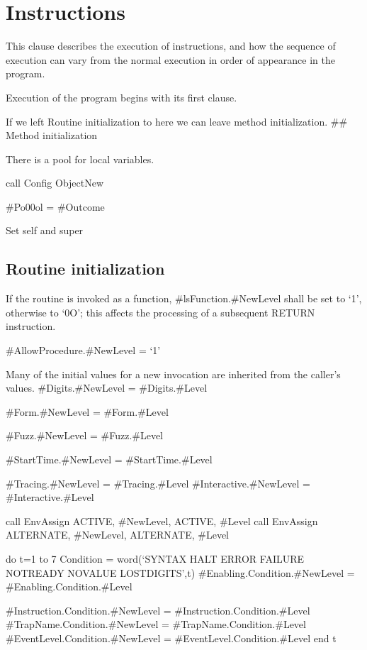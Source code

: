 \hypertarget{instructions}{%
\chapter{Instructions}\label{instructions}}

This clause describes the execution of instructions, and how the
sequence of execution can vary from the normal execution in order of
appearance in the program.

Execution of the program begins with its first clause.

If we left Routine initialization to here we can leave method
initialization. \#\# Method initialization

There is a pool for local variables.

call Config ObjectNew

\#Po00ol = \#Outcome

Set self and super

\hypertarget{routine-initialization}{%
\section{Routine initialization}\label{routine-initialization}}

If the routine is invoked as a function, \#lsFunction.\#NewLevel shall
be set to `1', otherwise to `0O'; this affects the processing of a
subsequent RETURN instruction.

\#AllowProcedure.\#NewLevel = `1'

Many of the initial values for a new invocation are inherited from the
caller's values. \#Digits.\#NewLevel = \#Digits.\#Level

\#Form.\#NewLevel = \#Form.\#Level

\#Fuzz.\#NewLevel = \#Fuzz.\#Level

\#StartTime.\#NewLevel = \#StartTime.\#Level

\#Tracing.\#NewLevel = \#Tracing.\#Level \#Interactive.\#NewLevel =
\#Interactive.\#Level

call EnvAssign ACTIVE, \#NewLevel, ACTIVE, \#Level call EnvAssign
ALTERNATE, \#NewLevel, ALTERNATE, \#Level

do t=1 to 7 Condition = word(`SYNTAX HALT ERROR FAILURE NOTREADY NOVALUE
LOSTDIGITS',t) \#Enabling.Condition.\#NewLevel =
\#Enabling.Condition.\#Level

\#Instruction.Condition.\#NewLevel = \#Instruction.Condition.\#Level
\#TrapName.Condition.\#NewLevel = \#TrapName.Condition.\#Level
\#EventLevel.Condition.\#NewLevel = \#EventLevel.Condition.\#Level end t


